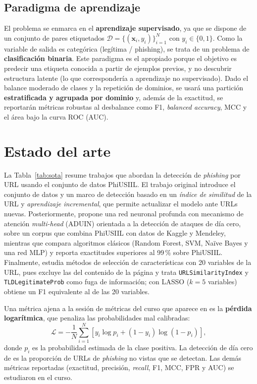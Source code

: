 \documentclass[conference]{IEEEtran}
\begin{document}
\subsection{Paradigma de aprendizaje}
El problema se enmarca en el \textbf{aprendizaje supervisado}, ya que se dispone de un conjunto
de pares etiquetados $\mathcal{D}=\{(\mathbf{x}_i,y_i)\}_{i=1}^{N}$ con $y_i\in\{0,1\}$. Como la
variable de salida es categórica (legítima / phishing), se trata de un problema de
\textbf{clasificación binaria}. Este paradigma es el apropiado porque el objetivo es predecir
una etiqueta conocida a partir de ejemplos previos, y no descubrir estructura latente (lo que
correspondería a aprendizaje no supervisado). Dado el balance moderado de clases y la repetición
de dominios, se usará una partición \textbf{estratificada y agrupada por dominio} y, además de la exactitud, se reportarán métricas robustas al
desbalance como F1, \textit{balanced accuracy}, MCC y el área bajo la curva ROC (AUC).

\section{Estado del arte}
\label{sec:estado}
La Tabla~\ref{tab:sota} resume trabajos que abordan la detección de \textit{phishing} por URL
usando el conjunto de datos PhiUSIIL. El trabajo original \cite{prasad2024} introduce el
conjunto de datos y un marco de detección basado en un \emph{índice de similitud} de la URL y
\emph{aprendizaje incremental}, que permite actualizar el modelo ante URLs nuevas.
Posteriormente, \cite{gobinath2026} propone una red neuronal profunda con mecanismo de atención
\textit{multi-head} (ADUIN) orientada a la detección de ataques de día cero, sobre un corpus que
combina PhiUSIIL con datos de Kaggle y Mendeley, mientras que \cite{bao2026} compara algoritmos
clásicos (Random Forest, SVM, Naïve Bayes y una red MLP) y reporta exactitudes superiores al
99\,\% sobre PhiUSIIL. Finalmente, \cite{yulianti2026} estudia métodos de selección de
características con 20 variables de la URL, pues excluye las del contenido de la página y trata
\texttt{URLSimilarityIndex} y \texttt{TLDLegitimateProb} como fuga de información; con LASSO
($k=5$ variables) obtiene un F1 equivalente al de las 20 variables.

Una métrica ajena a la sesión de métricas del curso que aparece en \cite{bao2026} es la
\textbf{pérdida logarítmica}, que penaliza las probabilidades mal calibradas:
\begin{equation}
\mathcal{L} = -\frac{1}{N}\sum_{i=1}^{N}\left[y_i\log p_i + (1-y_i)\log(1-p_i)\right],
\end{equation}
donde $p_i$ es la probabilidad estimada de la clase positiva. La detección de día cero de
\cite{gobinath2026} es la proporción de URLs de \textit{phishing} no vistas que se detectan. Las
demás métricas reportadas (exactitud, precisión, \textit{recall}, F1, MCC, FPR y AUC) se estudiaron
en el curso.
\end{document}
